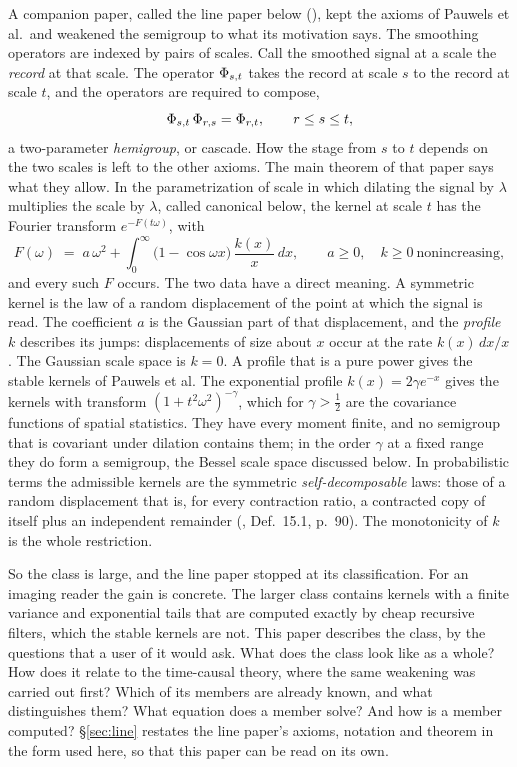 A companion paper, called the line paper below (), kept the
axioms of Pauwels et al.\ and weakened
the semigroup to what its motivation says. The smoothing operators are indexed by pairs of
scales. Call the smoothed signal at a scale the \emph{record} at that scale. The operator
$\Phi_{s,t}$ takes the record at scale $s$ to the record at scale $t$, and the operators are
required to compose,
\[
  \Phi_{s,t}\,\Phi_{r,s} = \Phi_{r,t}, \qquad r \le s \le t ,
\]
a two-parameter \emph{hemigroup}, or cascade. How the stage from $s$ to $t$ depends on the two
scales is left to the other axioms. The main theorem of that paper says what they allow. In
the parametrization of scale in which dilating the signal by $\lambda$ multiplies the scale by
$\lambda$, called canonical below, the kernel at scale $t$ has the Fourier transform
$e^{-F(t\omega)}$, with
\[
  F(\omega) \;=\; a\,\omega^2 + \int_0^\infty \bigl(1 - \cos\omega x\bigr)\,\frac{k(x)}{x}\,dx,
  \qquad a \ge 0, \quad k \ge 0 \ \text{nonincreasing},
\]
and every such $F$ occurs. The two data have a direct meaning. A symmetric kernel is the law
of a random displacement of the point at which the signal is read. The coefficient $a$ is the
Gaussian part of that displacement, and the \emph{profile} $k$ describes its jumps:
displacements of size about $x$ occur at the rate $k(x)\,dx/x$. The Gaussian scale space is
$k = 0$. A profile that is a pure power gives the stable kernels of Pauwels et al. The
exponential profile $k(x) = 2\gamma e^{-x}$ gives the kernels with transform
$(1 + t^2\omega^2)^{-\gamma}$, which for $\gamma > \tfrac12$ are the \Matern{} covariance
functions of spatial statistics. They have every moment finite, and no semigroup that is
covariant under dilation contains them; in the order $\gamma$ at a fixed range they do form
a semigroup, the Bessel scale space discussed below. In probabilistic terms
the admissible kernels are the symmetric \emph{self-decomposable} laws: those of a random
displacement that is, for every contraction ratio, a contracted copy of itself plus an
independent remainder (, Def.~15.1, p.~90). The monotonicity of $k$ is
the whole restriction.

So the class is large, and the line paper stopped at its classification. For an imaging
reader the gain is concrete. The larger class contains kernels with a finite variance and
exponential tails that are computed exactly by cheap recursive filters, which the stable
kernels are not. This paper describes the class, by the questions that a user of it would ask.
What does the class look like as a whole? How does it relate to the time-causal theory, where
the same weakening was carried out first? Which of its members are already known, and what
distinguishes them? What equation does a member solve? And how is a member computed?
\S\ref{sec:line} restates the
line paper's axioms, notation and theorem in the form used here, so that this paper can be
read on its own.

